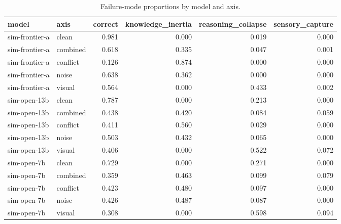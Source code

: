 \begin{table}[t]
\centering
\small
\begin{tabular}{llrrrr}
\toprule
model & axis & correct & knowledge\_inertia & reasoning\_collapse & sensory\_capture \\
\midrule
sim-frontier-a & clean & 0.981 & 0.000 & 0.019 & 0.000 \\
sim-frontier-a & combined & 0.618 & 0.335 & 0.047 & 0.001 \\
sim-frontier-a & conflict & 0.126 & 0.874 & 0.000 & 0.000 \\
sim-frontier-a & noise & 0.638 & 0.362 & 0.000 & 0.000 \\
sim-frontier-a & visual & 0.564 & 0.000 & 0.433 & 0.002 \\
sim-open-13b & clean & 0.787 & 0.000 & 0.213 & 0.000 \\
sim-open-13b & combined & 0.438 & 0.420 & 0.084 & 0.059 \\
sim-open-13b & conflict & 0.411 & 0.560 & 0.029 & 0.000 \\
sim-open-13b & noise & 0.503 & 0.432 & 0.065 & 0.000 \\
sim-open-13b & visual & 0.406 & 0.000 & 0.522 & 0.072 \\
sim-open-7b & clean & 0.729 & 0.000 & 0.271 & 0.000 \\
sim-open-7b & combined & 0.359 & 0.463 & 0.099 & 0.079 \\
sim-open-7b & conflict & 0.423 & 0.480 & 0.097 & 0.000 \\
sim-open-7b & noise & 0.426 & 0.487 & 0.087 & 0.000 \\
sim-open-7b & visual & 0.308 & 0.000 & 0.598 & 0.094 \\
\bottomrule
\end{tabular}
\caption{Failure-mode proportions by model and axis.}
\end{table}
